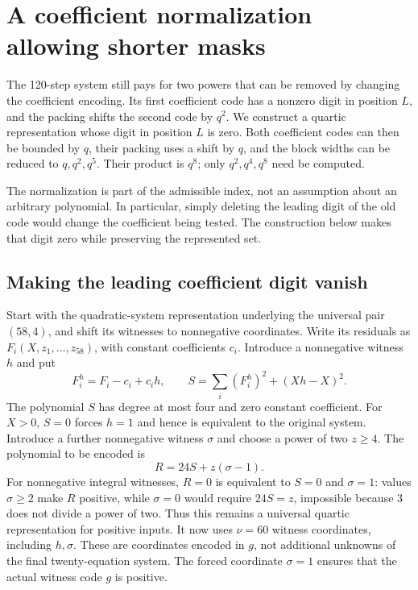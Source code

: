 \section{A coefficient normalization allowing shorter masks}
\label{sec:short-masks}

The 120-step system still pays for two powers that can be removed by
changing the coefficient encoding. Its first coefficient code has a
nonzero digit in position $L$, and the packing shifts the second code by
$q^2$. We construct a quartic representation whose digit in position $L$
is zero. Both coefficient codes can then be bounded by $q$, their packing
uses a shift by $q$, and the block widths can be reduced to
$q,q^2,q^5$. Their product is $q^8$; only $q^2,q^4,q^8$ need be computed.

The normalization is part of the admissible index, not an assumption
about an arbitrary polynomial. In particular, simply deleting the leading
digit of the old code would change the coefficient being tested. The
construction below makes that digit zero while preserving the represented
set.

\subsection{Making the leading coefficient digit vanish}

Start with the quadratic-system representation underlying the universal
pair $(58,4)$, and shift its witnesses to nonnegative coordinates. Write
its residuals as $F_i(X,z_1,\ldots,z_{58})$, with constant coefficients
$c_i$. Introduce a nonnegative witness $h$ and put
\[
 F_i^h=F_i-c_i+c_ih,
 \qquad
 S=\sum_i(F_i^h)^2+(Xh-X)^2.
\]
The polynomial $S$ has degree at most four and zero constant coefficient.
For $X>0$, $S=0$ forces $h=1$ and hence is equivalent to the original
system. Introduce a further nonnegative witness $\sigma$ and choose a
power of two $z\ge4$. The polynomial to be encoded is
\begin{equation}
 R=24S+z(\sigma-1).\label{eq:short-normalization}
\end{equation}
For nonnegative integral witnesses, $R=0$ is equivalent to $S=0$ and
$\sigma=1$: values $\sigma\ge2$ make $R$ positive, while $\sigma=0$
would require $24S=z$, impossible because $3$ does not divide a power of
two. Thus this remains a universal quartic representation for positive
inputs. It now uses $\nu=60$ witness coordinates, including $h,\sigma$.
These are coordinates encoded in $g$, not additional unknowns of the
final twenty-equation system.
The forced coordinate $\sigma=1$ ensures that the actual witness code
$g$ is positive.

